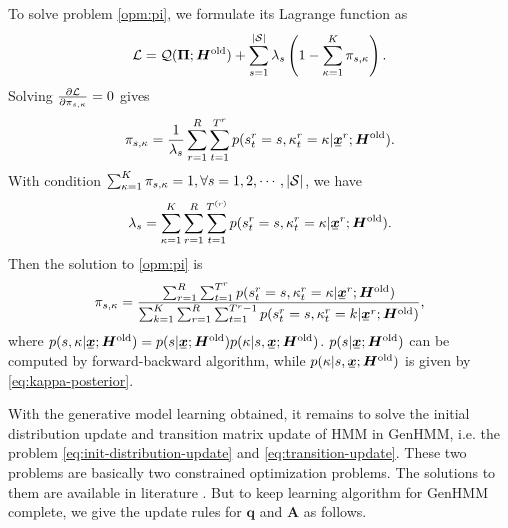 \documentclass[letterpaper]{article} %
\newcommand{\ubar}[1]{\mkern2mu\underline{\mkern-2mu #1\mkern-2mu}\mkern2mu}
\newcommand{\ubm}[1]{\ubar{\bm{#1}}}
\newcommand{\ubmr}[2]{\ubar{\bm{#1}}^{#2}}
\newcommand{\smtr}[3]{{#1}^{#3}_{#2}}
\begin{document}
To solve problem \eqref{opm:pi}, we formulate its Lagrange function as
\begin{equation}
  \mathcal{L} = \mathcal{Q}(\bm{\Pi}; \bm{H}^{\mathrm{old}}) + \sum_{s=1}^{|\mathcal{S}|} \lambda_s\left( 1-  \sum_{\kappa=1}^{K}\pi_{s, \kappa}  \right).
\end{equation}
Solving $\frac{ \partial \mathcal{L}}{\partial \pi_{s, \kappa}} = 0$ gives
\begin{equation}
  \pi_{s,\kappa} = \frac{1}{\lambda_s}\sum_{r=1}^{R} \sum_{t=1}^{{T}^{r}} p(\smtr{s}{t}{r}=s, \smtr{\kappa}{t}{r} =\kappa| \ubmr{x}{r}; \bm{H}^{\mathrm{old}}).
\end{equation}
With condition $\sum_{\kappa=1}^{K} \pi_{s, \kappa}= 1, \forall s = 1, 2, \cdots, |\mathcal{S}|$, we have
\begin{equation}
  \lambda_s = \sum_{\kappa=1}^{K}\sum_{r=1}^{R} \sum_{t=1}^{{T}^{(r)}} p(\smtr{s}{t}{r}=s, \smtr{\kappa}{t}{r} =\kappa | \ubmr{x}{r}; \bm{H}^{\mathrm{old}}).
\end{equation}
Then the solution to \eqref{opm:pi} is
\begin{equation}\label{eq:mix-latent-parameter-solution}
  \pi_{s, \kappa} = \frac{\sum_{r=1}^{R} \sum_{t=1}^{{T}^{r}} p(\smtr{s}{t}{r} =s, \smtr{\kappa}{t}{r}=\kappa | \ubmr{x}{r}; \bm{H}^{\mathrm{old}}) }{\sum_{k =1}^{K}\sum_{r=1}^{R} \sum_{t=1}^{{T}^{r}-1} p(\smtr{s}{t}{r} =s, \smtr{\kappa}{t}{r}=k | \ubmr{x}{r}; \bm{H}^{\mathrm{old}}) },
\end{equation}
where $p(s, \kappa | \ubm{x}; \bm{H}^{\mathrm{old}}) = p(s| \ubm{x}; \bm{H}^{\mathrm{old}}) p(\kappa | s, \ubm{x}; \bm{H}^{\mathrm{old}})$. $p(s| \ubm{x}; \bm{H}^{\mathrm{old}})$ can be computed by forward-backward algorithm, while $p(\kappa | s, \ubm{x}; \bm{H}^{\mathrm{old}})$ is given by \eqref{eq:kappa-posterior}.


With the generative model learning obtained, it remains to solve the initial distribution update and transition matrix update of HMM in GenHMM, i.e. the problem \eqref{eq:init-distribution-update} and \eqref{eq:transition-update}. These two problems are basically two constrained optimization problems. The solutions to them are available in literature \cite{Bishop:2006:PRM:1162264}. But to keep learning algorithm for GenHMM complete, we give the update rules for $\bm{q}$ and $\bm{A}$ as follows.
\end{document}
